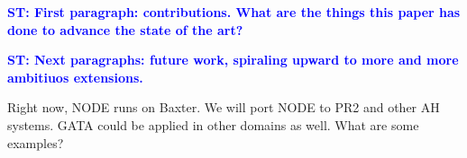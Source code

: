 \documentclass[conference]{IEEEtran}
\newcommand{\stnote}[1]{\textcolor{Blue}{\textbf{ST: #1}}}
\begin{document}
\stnote{First paragraph:  contributions.  What are the things this paper has done to advance the state of the art?}

\stnote{Next paragraphs: future work, spiraling upward to more and
  more ambitiuos extensions.}

Right now, NODE runs on Baxter. We will port NODE to PR2 and other AH systems.
GATA could be applied in other domains as well.  What are some examples?




\end{document}
